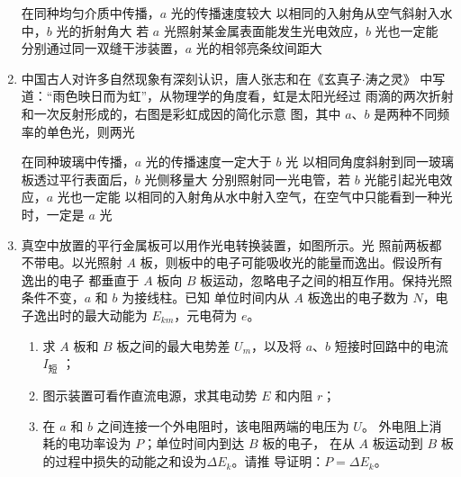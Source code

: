\begin{enumerate}
\fourchoices
{在同种均匀介质中传播，$ a $ 光的传播速度较大}
{以相同的入射角从空气斜射入水中，$ b $ 光的折射角大}
{若 $ a $ 光照射某金属表面能发生光电效应，$ b $ 光也一定能}
{分别通过同一双缝干涉装置，$ a $ 光的相邻亮条纹间距大}



\item 
{}
中国古人对许多自然现象有深刻认识，唐人张志和在《玄真子$ \cdot $涛之灵》
中写道：“雨色映日而为虹”，从物理学的角度看，虹是太阳光经过
雨滴的两次折射和一次反射形成的，右图是彩虹成因的简化示意
图，其中 $ a $、$ b $ 是两种不同频率的单色光，则两光  
\begin{figure}[h!]
	\centering
	
\end{figure}


\fourchoices
{在同种玻璃中传播，$ a $ 光的传播速度一定大于 $ b $ 光}
{以相同角度斜射到同一玻璃板透过平行表面后，$ b $ 光侧移量大}
{分别照射同一光电管，若 $ b $ 光能引起光电效应，$ a $ 光也一定能}
{以相同的入射角从水中射入空气，在空气中只能看到一种光时，一定是 $ a $ 光}



\item 
{}
真空中放置的平行金属板可以用作光电转换装置，如图所示。光
照前两板都不带电。以光照射 $ A $ 板，则板中的电子可能吸收光的能量而逸出。假设所有逸出的电子
都垂直于 $ A $ 板向 $ B $ 板运动，忽略电子之间的相互作用。保持光照条件不变，$ a $ 和 $ b $ 为接线柱。已知
单位时间内从 $ A $ 板逸出的电子数为 $ N $，电子逸出时的最大动能为 $ E_{km}  $，元电荷为 $ e $。
\begin{enumerate}
	\item
求 $ A $ 板和 $ B $ 板之间的最大电势差 $ U_{m} $，以及将 $ a $、$ b $ 短接时回路中的电流 $ I_{ \text{短} } $ ；


\item 
图示装置可看作直流电源，求其电动势 $ E $ 和内阻 $ r $；


\item 
在 $ a $ 和 $ b $ 之间连接一个外电阻时，该电阻两端的电压为 $ U $。
外电阻上消耗的电功率设为 $ P $；单位时间内到达 $ B $ 板的电子，
在从 $ A $ 板运动到 $ B $ 板的过程中损失的动能之和设为$ \Delta E_{k} $。请推
导证明：$ P= \Delta E_{k} $。


\end{enumerate}
\end{enumerate}
